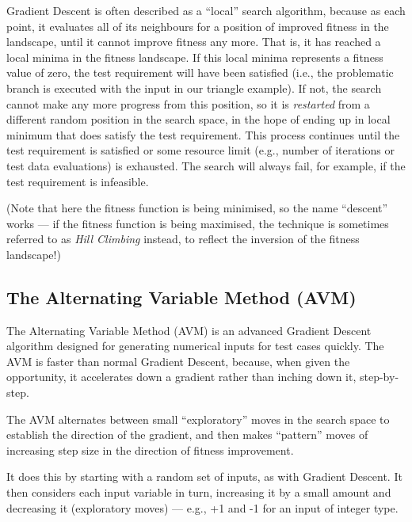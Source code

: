 Gradient Descent is often described as a ``local'' search algorithm, because as
each point, it evaluates all of its neighbours for a position of improved
fitness in the landscape, until it cannot improve fitness any more. That is, it
has reached a local minima in the fitness landscape. If this local minima
represents a fitness value of zero, the test requirement will have been
satisfied (i.e., the problematic branch is executed with the input in our
triangle example). If not, the search cannot make any more progress from this
position, so it is {\it restarted} from a different random position in the
search space, in the hope of ending up in local minimum that does satisfy the
test requirement. This process continues until the test requirement is satisfied
or some resource limit (e.g., number of iterations or test data evaluations) is
exhausted. The search will always fail, for example, if the test requirement is
infeasible. 

(Note that here the fitness function is being minimised, so the name ``descent''
works --- if the fitness function is being maximised, the technique is sometimes
referred to as {\it Hill Climbing} instead, to reflect the inversion of the
fitness landscape!)


\subsection{The Alternating Variable Method (AVM)}

The Alternating Variable Method (AVM) is an advanced Gradient Descent algorithm
designed for generating numerical inputs for test cases quickly. The AVM is
faster than normal Gradient Descent, because, when given the opportunity, it
accelerates down a gradient rather than inching down it, step-by-step. 


The AVM alternates between small ``exploratory'' moves in the search space to
establish the direction of the gradient, and then makes ``pattern'' moves of
increasing step size in the direction of fitness improvement. 


It does this by starting with a random set of inputs, as with Gradient Descent.
It then considers each input variable in turn, increasing it by a small amount
and decreasing it (exploratory moves) --- e.g., +1 and -1 for an input of
integer type. 

